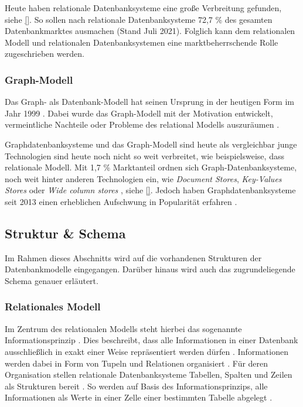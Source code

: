 Heute haben relationale Datenbanksysteme eine große Verbreitung gefunden, siehe \autoref{}. So sollen nach \cite{db_engines_ranking_july} relationale Datenbanksysteme 72,7 \% des gesamten Datenbankmarktes ausmachen (Stand Juli 2021). Folglich kann dem relationalen Modell und relationalen Datenbanksystemen eine marktbeherrschende Rolle zugeschrieben werden.


\subsubsection{Graph-Modell}
Das Graph- als Datenbank-Modell hat seinen Ursprung in der heutigen Form im Jahr 1999 \cite{gdbms}. Dabei wurde das Graph-Modell mit der Motivation entwickelt, vermeintliche Nachteile oder Probleme des relational Modells auszuräumen \cite{gdbms}.

Graphdatenbanksysteme und das Graph-Modell sind heute als vergleichbar junge Technologien sind heute noch nicht so weit verbreitet, wie beispielsweise, dass relationale Modell. Mit 1,7 \% Marktanteil ordnen sich Graph-Datenbanksysteme, noch weit hinter anderen Technologien ein, wie \textit{Document Stores}, \textit{Key-Values Stores} oder \textit{Wide column stores} \cite{db_engines_ranking_july}, siehe \autoref{}. Jedoch haben Graphdatenbanksysteme seit 2013 einen erheblichen Aufschwung in Popularität erfahren \cite{db_engines_ranking_july}. 

\subsection{Struktur \& Schema}
Im Rahmen dieses Abschnitts wird auf die vorhandenen Strukturen der Datenbankmodelle eingegangen. Darüber hinaus wird auch das zugrundeliegende Schema genauer erläutert. 

\subsubsection{Relationales Modell}
\label{datenmodelle:structure:relational}
Im Zentrum des relationalen Modells steht hierbei das sogenannte Informationsprinzip \cite{rdbms_history}. Dies beschreibt, dass alle Informationen in einer Datenbank ausschließlich in exakt einer Weise repräsentiert werden dürfen \cite{codd_relational_model}. Informationen werden dabei in Form von Tupeln und Relationen organisiert \cite{codd_relational_model}. Für deren Organisation stellen relationale Datenbanksysteme Tabellen, Spalten und Zeilen als Strukturen bereit \cite{rdbms_history}. So werden auf Basis des Informationsprinzips, alle Informationen als Werte in einer Zelle einer bestimmten Tabelle abgelegt \cite{rdbms_history}.

